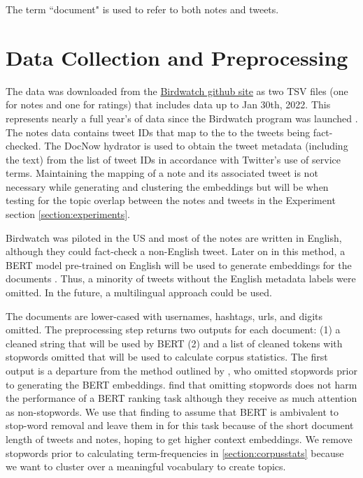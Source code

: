 \documentclass [11pt, proquest] {uwthesis}[2020/02/24]
\begin{document}
The term ``document" is used to refer to both notes and tweets.


\section{Data Collection and Preprocessing}\label{section:preprocessing}

The data was downloaded from the \href{https://twitter.github.io/birdwatch/download-data/}{Birdwatch github site} as two TSV files (one for notes and one for ratings) that includes data up to Jan 30th, 2022. This represents nearly a full year’s of data since the Birdwatch program was launched \cite{coleman_2021}. The notes data contains tweet IDs that map to the to the tweets being fact-checked. The DocNow hydrator \citep{docnow_hydrator} is used to obtain the tweet metadata (including the text) from the list of tweet IDs in accordance with Twitter’s use of service terms. Maintaining the mapping of a note and its associated tweet is not necessary while generating and clustering the embeddings but will be when testing for the topic overlap between the notes and tweets in the Experiment section \ref{section:experiments}.

Birdwatch was piloted in the US and most of the notes are written in English, although they could fact-check a non-English tweet. Later on in this method, a BERT model pre-trained on English \citep{DBLP:journals/corr/abs-1810-04805} will be used to generate embeddings for the documents . Thus, a minority of tweets without the English metadata labels were omitted. In the future, a multilingual approach could be used.

The documents are lower-cased with usernames, hashtags, urls, and digits omitted. The preprocessing step returns two outputs for each document: (1) a cleaned string that will be used by BERT (2) and a list of cleaned tokens with stopwords omitted that will be used to calculate corpus statistics. The first output  is a departure from the method outlined by \cite{sia-etal-2020-tired}, who omitted stopwords prior to generating the BERT embeddings. \cite{Qiao2019UnderstandingTB} find that omitting stopwords does not harm the performance of a BERT ranking task although they receive as much attention as non-stopwords. We use that finding to assume that BERT is ambivalent to stop-word removal and leave them in for this task because of the short document length of tweets and notes, hoping to get higher context embeddings. We remove stopwords prior to calculating term-frequencies in \ref{section:corpusstats} because we want to cluster over a meaningful vocabulary to create topics.
\end{document}
